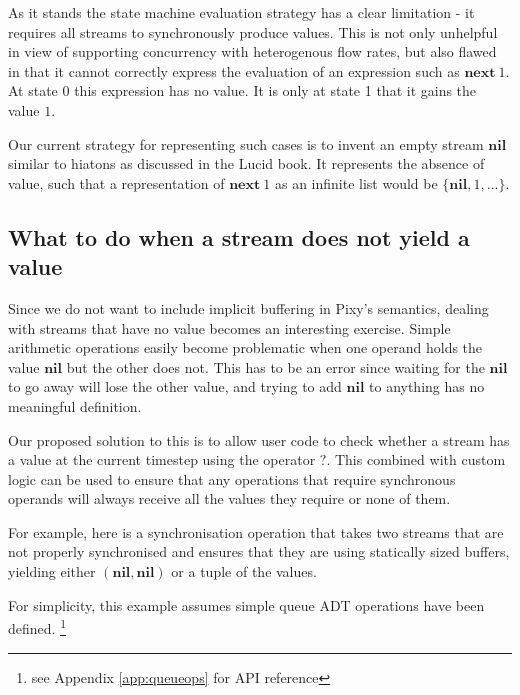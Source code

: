 \documentclass{scrartcl}
\begin{document}
    As it stands the state machine evaluation strategy has a clear limitation - it requires all streams to synchronously produce values. This is not only unhelpful in view of supporting concurrency with heterogenous flow rates, but also flawed in that it cannot correctly express the evaluation of an expression such as $\textbf{next}\ 1$. At state 0 this expression has no value. It is only at state 1 that it gains the value $1$.
    
    Our current strategy for representing such cases is to invent an empty stream $\textbf{nil}$ similar to hiatons as discussed in the Lucid book. It represents the absence of value, such that a representation of $\textbf{next}\ 1$ as an infinite list would be $\{\textbf{nil}, 1, ...\}$.
    
    \subsection{What to do when a stream does not yield a value}
    
    \label{subsec:async}
    
    Since we do not want to include implicit buffering in Pixy's semantics, dealing with streams that have no value becomes an interesting exercise. Simple arithmetic operations easily become problematic when one operand holds the value $\textbf{nil}$ but the other does not. This has to be an error since waiting for the $\textbf{nil}$ to go away will lose the other value, and trying to add $\textbf{nil}$ to anything has no meaningful definition.
    
    Our proposed solution to this is to allow user code to check whether a stream has a value at the current timestep using the operator $?$. This combined with custom logic can be used to ensure that any operations that require synchronous operands will always receive all the values they require or none of them.
    
    For example, here is a synchronisation operation that takes two streams that are not properly synchronised and ensures that they are using statically sized buffers, yielding either $(\textbf{nil}, \textbf{nil})$ or a tuple of the values.
    
    For simplicity, this example assumes simple queue ADT operations have been defined.
    \footnote{see Appendix \ref{app:queueops} for API reference}
    
\end{document}
